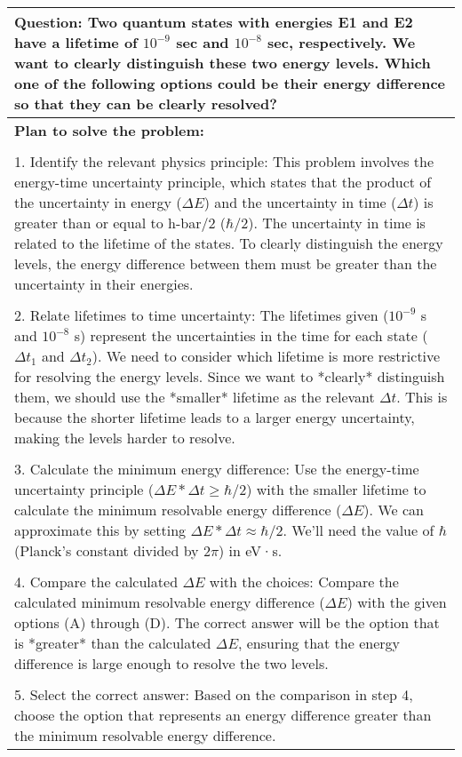 \begin{table*}
\centering
\footnotesize
\begin{tabular}{p{\linewidth}}
\toprule
\textbf{Question:} Two quantum states with energies E1 and E2 have a lifetime of $10^{-9}$ sec and $10^{-8}$ sec, respectively. We want to clearly distinguish these two energy levels. Which one of the following options could be their energy difference so that they can be clearly resolved? \\ \midrule
\textbf{Plan to solve the problem:}\\ \\ 1. Identify the relevant physics principle: This problem involves the energy-time uncertainty principle, which states that the product of the uncertainty in energy ($\Delta E$) and the uncertainty in time ($\Delta t$) is greater than or equal to h-bar/2 ($\hbar/2$). The uncertainty in time is related to the lifetime of the states. To clearly distinguish the energy levels, the energy difference between them must be greater than the uncertainty in their energies.\\ \\ 2. Relate lifetimes to time uncertainty: The lifetimes given ($10^{-9}$ s and $10^{-8}$ s) represent the uncertainties in the time for each state ($\Delta t_1$ and $\Delta t_2$). We need to consider which lifetime is more restrictive for resolving the energy levels. Since we want to *clearly* distinguish them, we should use the *smaller* lifetime as the relevant $\Delta t$. This is because the shorter lifetime leads to a larger energy uncertainty, making the levels harder to resolve.\\ \\ 3. Calculate the minimum energy difference: Use the energy-time uncertainty principle ($\Delta E * \Delta t \geq \hbar/2$) with the smaller lifetime to calculate the minimum resolvable energy difference ($\Delta E$). We can approximate this by setting $\Delta E * \Delta t \approx \hbar/2$. We'll need the value of $\hbar$ (Planck's constant divided by $2\pi$) in eV·s.\\ \\ 4. Compare the calculated $\Delta E$ with the choices: Compare the calculated minimum resolvable energy difference ($\Delta E$) with the given options (A) through (D). The correct answer will be the option that is *greater* than the calculated $\Delta E$, ensuring that the energy difference is large enough to resolve the two levels.\\ \\ 5. Select the correct answer: Based on the comparison in step 4, choose the option that represents an energy difference greater than the minimum resolvable energy difference. \\ \midrule

\end{tabular}
\end{table*}
